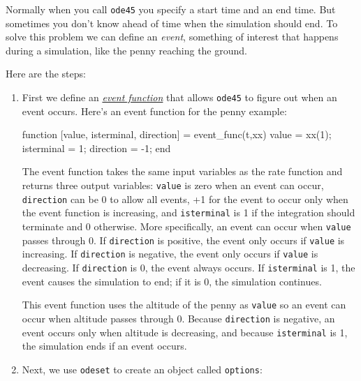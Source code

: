 
Normally when you call \lstinline{ode45} you specify a start time and
an end time.  But sometimes you don't know ahead of time when the
simulation should end.  To solve this problem we can define an \emph{event},
something of interest that happens during a simulation,
like the penny reaching the ground.

Here are the steps:


\begin{enumerate}

\item First we define an \href{https://www.mathworks.com/help/matlab/math/ode-event-location.html}{\emph{event function}} that allows \lstinline{ode45} to figure out when
an event occurs.  Here's an event function for the penny example:

\begin{code}
function [value, isterminal, direction] = event_func(t,xx)
    value = xx(1);
    isterminal = 1;
    direction = -1;
end
\end{code}

The event function takes the same input variables as the rate function and returns three output variables: \lstinline{value} is zero when an event can occur, \lstinline{direction} can be 0 to allow all events, +1 for the event to occur only when the event function is increasing, and \lstinline{isterminal} is 1 if the integration should terminate and 0 otherwise. 
More specifically, an event can occur when \lstinline{value} passes through 0.
If \lstinline{direction} is positive, the event only occurs if \lstinline{value} is increasing.
 If \lstinline{direction} is negative, the event only occurs if \lstinline{value} is decreasing.
If \lstinline{direction} is 0, the event always occurs.
If \lstinline{isterminal} is 1, the event causes the simulation to end; if it is 0, the simulation continues.

This event function uses the altitude of the penny as \lstinline{value} so an event can occur when altitude passes through 0.
Because \lstinline{direction} is negative, an event occurs only when altitude is decreasing, and
because \lstinline{isterminal} is 1, the simulation ends if an event occurs.


\item Next, we use \lstinline{odeset} to create an object called \lstinline{options}:


\end{enumerate}
